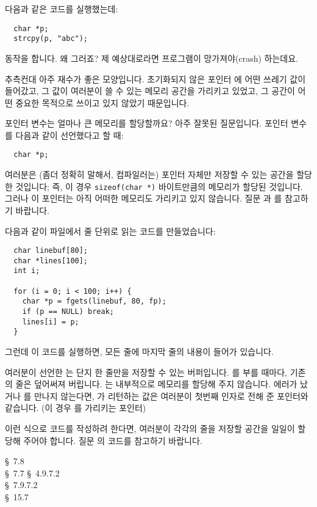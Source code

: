 \begin{faq}
	다음과 같은 코드를 실행했는데:
\begin{verbatim}
  char *p;
  strcpy(p, "abc");
\end{verbatim}
	\noindent 동작을 합니다.  왜 그러죠? 제 예상대로라면 프로그램이
	망가져야(crash) 하는데요.

\A
	추측컨대 아주 재수가 좋은 모양입니다.  초기화되지 않은 포인터 에
	어떤 쓰레기 값이 들어갔고, 그 값이 여러분이 쓸 수 있는 메모리 공간을
	가리키고 있었고, 그 공간이 어떤 중요한 목적으로 쓰이고 있지 않았기
	때문입니다.
\end{faq}

\begin{faq}
	포인터 변수는 얼마나 큰 메모리를 할당할까요?
\A
	아주 잘못된 질문입니다.  포인터 변수를 다음과 같이 선언했다고 할 때:
\begin{verbatim}
  char *p;
\end{verbatim}
	\noindent 여러분은 (좀더 정확히 말해서, 컴파일러는) 포인터 자체만
	저장할 수 있는 공간을 할당한 것입니다; 즉, 이 경우
	\verb+sizeof(char *)+ 바이트만큼의 메모리가 할당된 것입니다.
	그러나 이 포인터는 아직 어떠한 메모리도 가리키고 있지 않습니다.
	질문 과 를 참고하기 바랍니다.
\end{faq}

\begin{faq}
	다음과 같이 파일에서 줄 단위로 읽는 코드를 만들었습니다:
\begin{verbatim}
  char linebuf[80];
  char *lines[100];
  int i;

  for (i = 0; i < 100; i++) {
    char *p = fgets(linebuf, 80, fp);
    if (p == NULL) break;
    lines[i] = p;
  }
\end{verbatim}
	그런데 이 코드를 실행하면, 모든 줄에 마지막 줄의 내용이 들어가 있습니다.

\A
	여러분이 선언한 는 단지 한 줄만을 저장할 수 있는
	버퍼입니다.  를 부를 때마다, 기존의 줄은 덮어써져 버립니다.
	는 내부적으로 메모리를 할당해 주지 않습니다.
	에러가 났거나 를 만나지 않는다면, 가 리턴하는
	값은 여러분이 첫번째 인자로 전해 준 포인터와 같습니다.
	(이 경우 를 가리키는 포인터)

	이런 식으로 코드를 작성하려 한다면, 여러분이 각각의 줄을 저장할
	공간을 일일이 할당해 주어야 합니다.
	질문 의 코드를 참고하기 바랍니다.

\R
	\cite{kr1} \S\ 7.8  \\
	\cite{kr2} \S\ 7.7 
	\cite{ansi} \S\ 4.9.7.2 \\
	\cite{c89} \S\ 7.9.7.2 \\
	\cite{hs} \S\ 15.7 
\end{faq}


